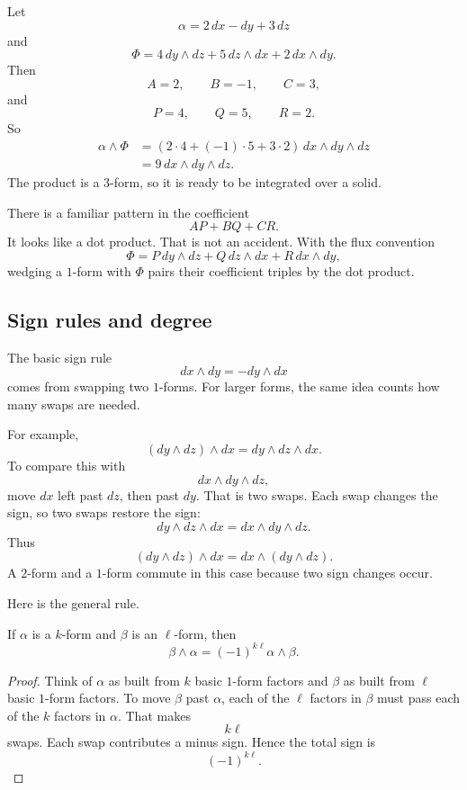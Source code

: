 \begin{example}
Let
\[
    \alpha=2\,dx-dy+3\,dz
\]
and
\[
    \Phi=4\,dy\wedge dz+5\,dz\wedge dx+2\,dx\wedge dy.
\]
Then
\[
    A=2,\qquad B=-1,\qquad C=3,
\]
and
\[
    P=4,\qquad Q=5,\qquad R=2.
\]
So
\[
\begin{aligned}
    \alpha\wedge\Phi
    &=
    (2\cdot4+(-1)\cdot5+3\cdot2)\,
    dx\wedge dy\wedge dz\\
    &=
    9\,dx\wedge dy\wedge dz.
\end{aligned}
\]
The product is a \(3\)-form, so it is ready to be integrated over a solid.
\end{example}

There is a familiar pattern in the coefficient
\[
    AP+BQ+CR.
\]
It looks like a dot product.  That is not an accident.  With the flux convention
\[
    \Phi=P\,dy\wedge dz+Q\,dz\wedge dx+R\,dx\wedge dy,
\]
wedging a \(1\)-form with \(\Phi\) pairs their coefficient triples by the dot product.

\subsection{Sign rules and degree}

The basic sign rule
\[
    dx\wedge dy=-dy\wedge dx
\]
comes from swapping two \(1\)-forms.  For larger forms, the same idea counts how many
swaps are needed.

For example,
\[
    (dy\wedge dz)\wedge dx
    =
    dy\wedge dz\wedge dx.
\]
To compare this with
\[
    dx\wedge dy\wedge dz,
\]
move \(dx\) left past \(dz\), then past \(dy\).  That is two swaps.  Each swap changes
the sign, so two swaps restore the sign:
\[
    dy\wedge dz\wedge dx
    =
    dx\wedge dy\wedge dz.
\]
Thus
\[
\boxed{
    (dy\wedge dz)\wedge dx
    =
    dx\wedge(dy\wedge dz).
}
\]
A \(2\)-form and a \(1\)-form commute in this case because two sign changes occur.

Here is the general rule.

\begin{theorem}
If \(\alpha\) is a \(k\)-form and \(\beta\) is an \(\ell\)-form, then
\[
\boxed{
    \beta\wedge\alpha
    =
    (-1)^{k\ell}\alpha\wedge\beta.
}
\]
\end{theorem}

\begin{proof}
Think of \(\alpha\) as built from \(k\) basic \(1\)-form factors and \(\beta\) as built
from \(\ell\) basic \(1\)-form factors.  To move \(\beta\) past \(\alpha\), each of the
\(\ell\) factors in \(\beta\) must pass each of the \(k\) factors in \(\alpha\).  That makes
\[
    k\ell
\]
swaps.  Each swap contributes a minus sign.  Hence the total sign is
\[
    (-1)^{k\ell}.
\]
\end{proof}

